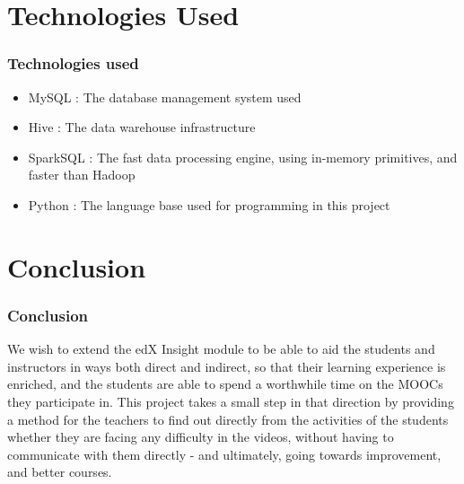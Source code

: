 \documentclass[12pt,xcolor=dvipsnames]{beamer}
\begin{document}
\section{Technologies Used}
\begin{frame}[t]
\frametitle{Technologies used}

\begin{itemize}

\item MySQL		:	The database management system used

\item Hive		:	The data warehouse infrastructure

\item SparkSQL	:	The fast data processing engine, using in-memory primitives, and faster than Hadoop

\item Python		:	The language base used for programming in this project

\end{itemize}
\end{frame}


\section{Conclusion}
\begin{frame}[t]
\frametitle{Conclusion}


We wish to extend the edX Insight module to be able to aid the students and instructors in ways both direct and indirect, so that their learning experience is enriched, and the students are able to spend a worthwhile time on the MOOCs they participate in. This project takes a small step in that direction by providing a method for the teachers to find out directly from the activities of the students whether they are facing any difficulty in the videos, without having to communicate with them directly - and ultimately, going towards improvement, and better courses. 

\end{frame}
\end{document}

